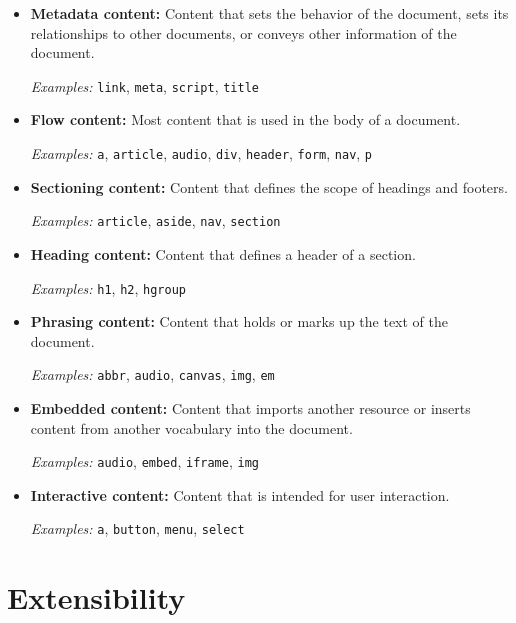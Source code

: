 \begin{itemize}
\item \textbf{Metadata content:} Content that sets the behavior of the
  document, sets its relationships to other documents, or conveys
  other information of the document.

  \textit{Examples:} \texttt{link}, \texttt{meta}, \texttt{script},
  \texttt{title}

\item \textbf{Flow content:} Most content that is used in the body of
  a document.

  \textit{Examples:} \texttt{a}, \texttt{article}, \texttt{audio},
  \texttt{div}, \texttt{header}, \texttt{form}, \texttt{nav},
  \texttt{p}

\item \textbf{Sectioning content:} Content that defines the scope of
  headings and footers.

  \textit{Examples:} \texttt{article}, \texttt{aside}, \texttt{nav},
  \texttt{section}

\item \textbf{Heading content:} Content that defines a header of a
  section.

  \textit{Examples:} \texttt{h1}, \texttt{h2}, \texttt{hgroup}

\item \textbf{Phrasing content:} Content that holds or marks up the
  text of the document.

  \textit{Examples:} \texttt{abbr}, \texttt{audio}, \texttt{canvas},
  \texttt{img}, \texttt{em}

\item \textbf{Embedded content:} Content that imports another resource
  or inserts content from another vocabulary into the document.

  \textit{Examples:} \texttt{audio}, \texttt{embed}, \texttt{iframe},
  \texttt{img}

\item \textbf{Interactive content:} Content that is intended for user
  interaction.

  \textit{Examples:} \texttt{a}, \texttt{button}, \texttt{menu},
  \texttt{select}

\end{itemize}

\section{Extensibility}

